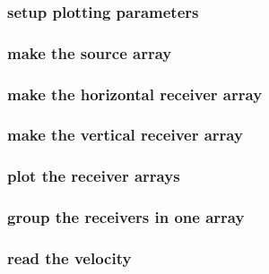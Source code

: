 \begin{frame} \frametitle{setup plotting parameters}
  \normalsize
  \blueshade{
    
  }
\end{frame}
\cwpnote{}

\begin{frame} \frametitle{make the source array}
  \normalsize
  \blueshade{
    
  }
\end{frame}
\cwpnote{}

\begin{frame} \frametitle{make the horizontal receiver array}
  \normalsize
  \blueshade{
    
  }
\end{frame}
\cwpnote{}

\begin{frame} \frametitle{make the vertical receiver array}
  \normalsize
  \blueshade{
    
  }
\end{frame}
\cwpnote{}

\begin{frame} \frametitle{plot the receiver arrays}
  \normalsize
  \blueshade{
    
  }
\end{frame}
\cwpnote{}

\begin{frame}  \end{frame}
\begin{frame}  \end{frame}

\begin{frame} \frametitle{group the receivers in one array}
  \normalsize
  \blueshade{
    
  }
\end{frame}
\cwpnote{}

\begin{frame} \frametitle{read the velocity}
  \normalsize
  \blueshade{
    
  }
\end{frame}
\cwpnote{}

